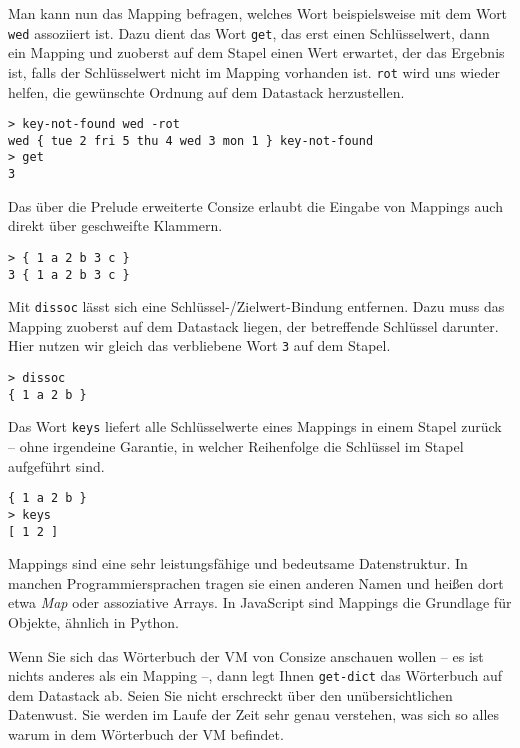 Man kann nun das Mapping befragen, welches Wort beispielsweise mit dem Wort \verb|wed| assoziiert ist. Dazu dient das Wort \verb|get|, das erst einen Schlüsselwert, dann ein Mapping und zuoberst auf dem Stapel einen Wert erwartet, der das Ergebnis ist, falls der Schlüsselwert nicht im Mapping vorhanden ist. \verb|rot| wird uns wieder helfen, die gewünschte Ordnung auf dem Datastack herzustellen.

\begin{verbatim}
> key-not-found wed -rot
wed { tue 2 fri 5 thu 4 wed 3 mon 1 } key-not-found
> get
3
\end{verbatim}

Das über die Prelude erweiterte Consize erlaubt die Eingabe von Mappings auch direkt über geschweifte Klammern.

\begin{verbatim}
> { 1 a 2 b 3 c }
3 { 1 a 2 b 3 c }
\end{verbatim}

Mit \verb|dissoc| lässt sich eine Schlüssel-\slash Zielwert-Bindung entfernen. Dazu muss das Mapping zuoberst auf dem Datastack liegen, der betreffende Schlüssel darunter. Hier nutzen wir gleich das verbliebene Wort \verb|3| auf dem Stapel.

\begin{verbatim}
> dissoc
{ 1 a 2 b }
\end{verbatim}

Das Wort \verb|keys| liefert alle Schlüsselwerte eines Mappings in einem Stapel zurück -- ohne irgendeine Garantie, in welcher Reihenfolge die Schlüssel im Stapel aufgeführt sind.

\begin{verbatim}
{ 1 a 2 b }
> keys
[ 1 2 ]
\end{verbatim}

Mappings sind eine sehr leistungsfähige und bedeutsame Datenstruktur. In manchen Programmiersprachen tragen sie einen anderen Namen und heißen dort etwa \emph{Map} oder assoziative Arrays. In JavaScript sind Mappings die Grundlage für Objekte, ähnlich in Python.

Wenn Sie sich das Wörterbuch der VM von Consize anschauen wollen -- es ist nichts anderes als ein Mapping --, dann legt Ihnen \verb|get-dict| das Wörterbuch auf dem Datastack ab. Seien Sie nicht erschreckt über den unübersichtlichen Datenwust. Sie werden im Laufe der Zeit sehr genau verstehen, was sich so alles warum in dem Wörterbuch der VM befindet.

